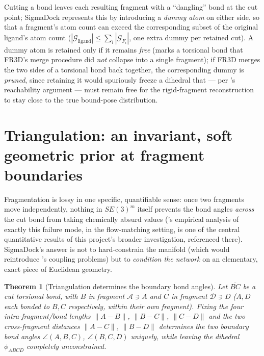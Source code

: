 \documentclass[11pt,a4paper]{report}
\newtheorem{theorem}{Theorem}[chapter]
\theoremstyle{definition}
\theoremstyle{remark}
\begin{document}
Cutting a bond leaves each resulting fragment with a ``dangling'' bond at
the cut point; SigmaDock represents this by introducing a \emph{dummy
atom} on either side, so that a fragment's atom count can exceed the
corresponding subset of the original ligand's atom count
($|\mathcal G_{\mathrm{ligand}}|\le\sum_i|\mathcal G_{F_i}|$, one extra
dummy per retained cut). A dummy atom is retained only if it remains
\emph{free} (marks a torsional bond that FR3D's merge procedure did
\emph{not} collapse into a single fragment); if FR3D merges the two sides
of a torsional bond back together, the corresponding dummy is
\emph{pruned}, since retaining it would spuriously freeze a dihedral that
--- per 's reachability argument --- must
remain free for the rigid-fragment reconstruction to stay close to the true
bound-pose distribution.

\section{Triangulation: an invariant, soft geometric prior at fragment boundaries}
\label{sec:triangulation-precise}

Fragmentation is lossy in one specific, quantifiable sense: once two
fragments move independently, nothing in $SE(3)^m$ itself prevents the
bond angles \emph{across} the cut bond from taking chemically absurd
values ('s empirical analysis of exactly this failure
mode, in the flow-matching setting, is one of the central quantitative
results of this project's broader investigation, referenced there).
SigmaDock's answer is not to hard-constrain the manifold (which would
reintroduce 's coupling problems) but to
\emph{condition the network} on an elementary, exact piece of Euclidean
geometry.

\begin{theorem}[Triangulation determines the boundary bond angles]
\label{thm:triangulation-precise}
Let $\overline{BC}$ be a cut torsional bond, with $B$ in fragment
$\mathcal A\ni A$ and $C$ in fragment $\mathcal D\ni D$ ($A,D$ each bonded
to $B,C$ respectively, within their own fragment). Fixing the four
intra-fragment/bond lengths $\|A-B\|$, $\|B-C\|$, $\|C-D\|$ and the two
\emph{cross-fragment} distances $\|A-C\|$, $\|B-D\|$ determines the two
boundary bond angles $\angle(A,B,C)$, $\angle(B,C,D)$ uniquely, while
leaving the dihedral $\phi_{ABCD}$ completely unconstrained.
\end{theorem}
\end{document}
